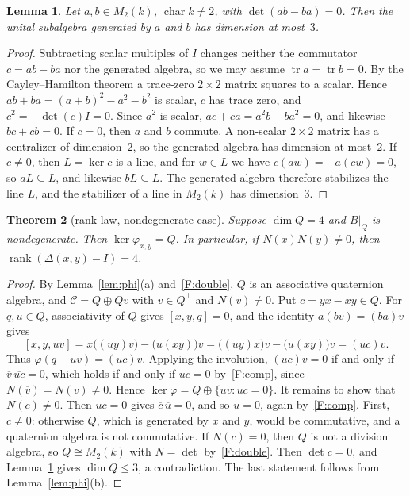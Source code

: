 \documentclass[11pt]{amsart}
\newtheorem{theorem}{Theorem}[section]
\newtheorem{lemma}[theorem]{Lemma}
\theoremstyle{definition}
\theoremstyle{remark}
\newcommand{\C}{\mathcal{C}}
\newcommand{\conj}[1]{\overline{#1}}
\newcommand{\assoc}[3]{[#1,#2,#3]}
\DeclareMathOperator{\rank}{rank}
\DeclareMathOperator{\tr}{tr}
\begin{document}
\begin{lemma}\label{lem:m2}
Let $a,b\in M_2(k)$, $\operatorname{char}k\neq2$, with $\det(ab-ba)=0$.
Then the unital subalgebra generated by $a$ and $b$ has dimension at most~$3$.
\end{lemma}

\begin{proof}
Subtracting scalar multiples of $I$ changes neither the commutator
$c=ab-ba$ nor the generated algebra, so we may assume $\tr a=\tr b=0$. By the
Cayley--Hamilton theorem a trace-zero $2\times2$ matrix squares to a scalar.
Hence $ab+ba=(a+b)^2-a^2-b^2$ is scalar, $c$ has trace zero, and
$c^2=-\det(c)I=0$. Since $a^2$ is scalar, $ac+ca=a^2b-ba^2=0$, and likewise
$bc+cb=0$. If $c=0$, then $a$ and $b$ commute. A non-scalar $2\times2$ matrix has
a centralizer of dimension~$2$, so the generated algebra has dimension at
most~$2$. If $c\neq0$, then $L=\ker c$ is a line, and for $w\in L$ we have
$c(aw)=-a(cw)=0$, so $aL\subseteq L$, and likewise $bL\subseteq L$. The
generated algebra therefore stabilizes the line $L$, and the stabilizer of a
line in $M_2(k)$ has dimension~$3$.
\end{proof}

\begin{theorem}[rank law, nondegenerate case]\label{thm:rank-nondeg}
Suppose $\dim Q=4$ and $B|_Q$ is nondegenerate. Then $\ker\varphi_{x,y}=Q$.
In particular, if $N(x)N(y)\neq0$, then $\rank(\Delta(x,y)-I)=4$.
\end{theorem}

\begin{proof}
By Lemma~\ref{lem:phi}(a) and~\ref{F:double}, $Q$ is an associative quaternion
algebra, and $\C=Q\oplus Qv$ with $v\in Q^\perp$ and $N(v)\neq0$. Put
$c=yx-xy\in Q$. For $q,u\in Q$, associativity of $Q$ gives
$\assoc xyq=0$, and the identity $a(bv)=(ba)v$ gives
\[
  \assoc{x}{y}{uv}=x\bigl((uy)v\bigr)-\bigl(u(xy)\bigr)v
  =\bigl((uy)x\bigr)v-\bigl(u(xy)\bigr)v=(uc)v.
\]
Thus $\varphi(q+uv)=(uc)v$. Applying the involution, $(uc)v=0$ if and only if
$\conj v\,\conj{uc}=0$, which holds if and only if $uc=0$ by~\ref{F:comp},
since $N(\conj v)=N(v)\neq0$. Hence $\ker\varphi=Q\oplus\{uv:uc=0\}$. It
remains to show that $N(c)\neq0$. Then $uc=0$ gives $\conj c\,\conj u=0$, and
so $u=0$, again by~\ref{F:comp}. First, $c\neq0$: otherwise $Q$, which is
generated by $x$ and $y$, would be commutative, and a quaternion algebra is
not commutative. If $N(c)=0$, then $Q$ is not a division algebra, so
$Q\cong M_2(k)$ with $N=\det$ by~\ref{F:double}. Then $\det c=0$, and
Lemma~\ref{lem:m2} gives $\dim Q\le3$, a contradiction. The last statement
follows from Lemma~\ref{lem:phi}(b).
\end{proof}
\end{document}
